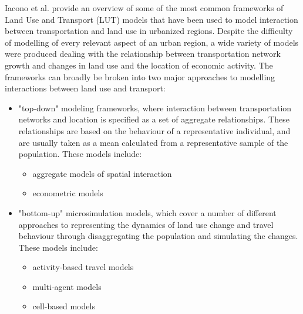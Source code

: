 Iacono et al.
\cite{Iacono2008} provide an overview of some of the most common frameworks of Land Use and Transport (LUT) models that have been used to model interaction between transportation and land use in urbanized regions.
Despite the difficulty of modelling of every relevant aspect of an urban region, a wide variety of models were produced dealing with the relationship between transportation network growth and changes in land use and the location of economic activity.
The frameworks can broadly be broken into two major approaches to modelling interactions between land use and transport:
\begin{itemize}
    \item "top-down" modeling frameworks, where interaction between transportation networks and location is specified as a set of aggregate relationships.
    These relationships are based on the behaviour of a representative individual, and are usually taken as a mean calculated from a representative sample of the population.
    These models include:
    \begin{itemize}
        \item aggregate models of spatial interaction
        \item econometric models
    \end{itemize}
    \item "bottom-up" microsimulation models, which cover a number of different approaches to representing the dynamics of land use change and travel behaviour through disaggregating the population and simulating the changes.
    These models include:
    \begin{itemize}
        \item activity-based travel models
        \item multi-agent models
        \item cell-based models
    \end{itemize}
\end{itemize}
